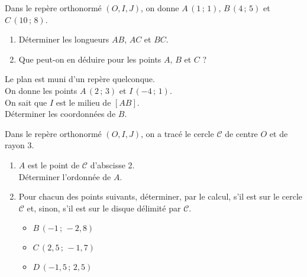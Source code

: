 \begin{multicols}{2}
\begin{exo}
\begin{enumerate}
\end{enumerate}

\end{exo}

\sautpage

\begin{exo}
Dans le rep\`ere orthonorm\'e $(O,I,J)$, on donne $A\,(1\,;\,1)$, $B\,(4\,;\,5)$ et $C\,(10\,;\,8)$.
\begin{enumerate}
 \item D\'eterminer les longueurs $AB$, $AC$ et $BC$.
 \item Que peut-on en d\'eduire pour les points $A$, $B$ et $C$ ?
\end{enumerate}

\end{exo}

\begin{exo}
 Le plan est muni d'un rep\`ere quelconque.\\
  On donne les points $A\,(2\,;\,3)$ et $I\,(-4\,;\,1)$.\\
  On sait que $I$ est le milieu de $[AB]$.\\
 D\'eterminer les coordonn\'ees de $B$.
\end{exo}





\begin{exo}
 Dans le rep\`ere orthonorm\'e $(O,I,J)$, on a trac\'e le cercle $\mathcal{C}$ de centre $O$ et de rayon 3.
\begin{enumerate}
 \item $A$ est le point de $\mathcal{C}$ d'abscisse 2.\\
D\'eterminer l'ordonn\'ee de $A$.
 \item Pour chacun des points suivants, d\'eterminer, par le calcul, s'il est sur le cercle $\mathcal{C}$ et, sinon, s'il est sur le disque d\'elimit\'e par $\mathcal{C}$.
  \begin{itemize}
   \item $B\,(-1\,;\,-2,8)$
   \item $C\,(2,5\,;\,-1,7)$
   \item $D\,(-1,5\,;\,2,5)$
  \end{itemize}%
\end{enumerate}




\end{exo}
\end{multicols}
